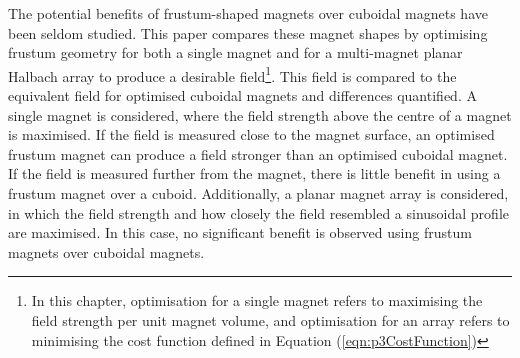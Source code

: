 The potential benefits of frustum-shaped magnets over cuboidal magnets have been seldom studied. This paper compares these magnet shapes by optimising frustum geometry for both a single magnet and for a multi-magnet planar Halbach array to produce a desirable field\footnote{In this chapter, optimisation for a single magnet refers to maximising the field strength per unit magnet volume, and optimisation for an array refers to minimising the cost function defined in Equation (\ref{eqn:p3CostFunction})}. This field is compared to the equivalent field for optimised cuboidal magnets and differences quantified. A single magnet is considered, where the field strength above the centre of a magnet is maximised. If the field is measured close to the magnet surface, an optimised frustum magnet can produce a field stronger than an optimised cuboidal magnet. If the field is measured further from the magnet, there is little benefit in using a frustum magnet over a cuboid. Additionally, a planar magnet array is considered, in which the field strength and how closely the field resembled a sinusoidal profile are maximised. In this case, no significant benefit is observed using frustum magnets over cuboidal magnets.